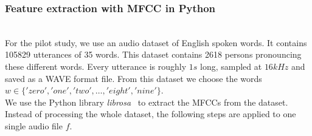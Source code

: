 
\subsubsection{Feature extraction with MFCC in Python}~\label{librosa}~\\


For the pilot study, we use an audio dataset of English spoken
words\cite{DBLP:journals/corr/abs-1804-03209}. It contains 105829 utterances of
35 words. This dataset contains 2618  persons pronouncing these different words.
Every utterance is roughly $1s$ long, sampled at $16kHz$ and saved as a WAVE
format file. From this dataset we choose the words $w \in \{'zero', 'one',
'two', \dots , 'eight', 'nine'\}$.\\

We use the Python library \textit{librosa}~\cite{librosa} to extract the MFCCs from the
dataset. Instead of processing the whole dataset, the following steps are
applied to one single audio file $f$.\\

